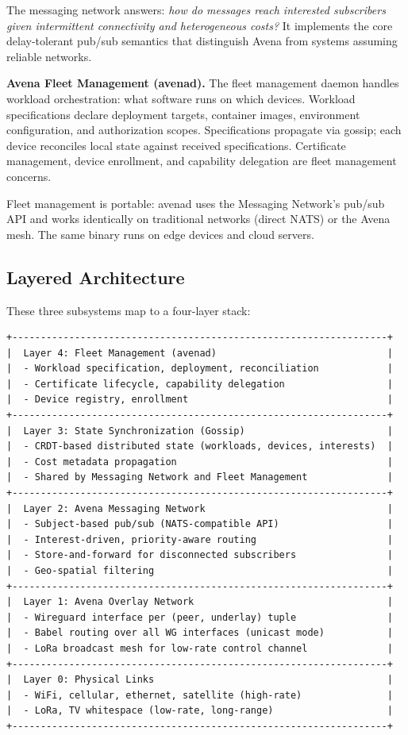 The messaging network answers: \emph{how do messages reach interested subscribers given intermittent connectivity and heterogeneous costs?} It implements the core delay-tolerant pub/sub semantics that distinguish Avena from systems assuming reliable networks.

\textbf{Avena Fleet Management (avenad).} The fleet management daemon handles workload orchestration: what software runs on which devices. Workload specifications declare deployment targets, container images, environment configuration, and authorization scopes. Specifications propagate via gossip; each device reconciles local state against received specifications. Certificate management, device enrollment, and capability delegation are fleet management concerns.

Fleet management is portable: avenad uses the Messaging Network's pub/sub API and works identically on traditional networks (direct NATS) or the Avena mesh. The same binary runs on edge devices and cloud servers.

\subsection{Layered Architecture}

These three subsystems map to a four-layer stack:

\begin{Verbatim}[frame=single,fontsize=\small]
+------------------------------------------------------------------+
|  Layer 4: Fleet Management (avenad)                              |
|  - Workload specification, deployment, reconciliation            |
|  - Certificate lifecycle, capability delegation                  |
|  - Device registry, enrollment                                   |
+------------------------------------------------------------------+
|  Layer 3: State Synchronization (Gossip)                         |
|  - CRDT-based distributed state (workloads, devices, interests)  |
|  - Cost metadata propagation                                     |
|  - Shared by Messaging Network and Fleet Management              |
+------------------------------------------------------------------+
|  Layer 2: Avena Messaging Network                                |
|  - Subject-based pub/sub (NATS-compatible API)                   |
|  - Interest-driven, priority-aware routing                       |
|  - Store-and-forward for disconnected subscribers                |
|  - Geo-spatial filtering                                         |
+------------------------------------------------------------------+
|  Layer 1: Avena Overlay Network                                  |
|  - Wireguard interface per (peer, underlay) tuple                |
|  - Babel routing over all WG interfaces (unicast mode)           |
|  - LoRa broadcast mesh for low-rate control channel              |
+------------------------------------------------------------------+
|  Layer 0: Physical Links                                         |
|  - WiFi, cellular, ethernet, satellite (high-rate)               |
|  - LoRa, TV whitespace (low-rate, long-range)                    |
+------------------------------------------------------------------+
\end{Verbatim}

